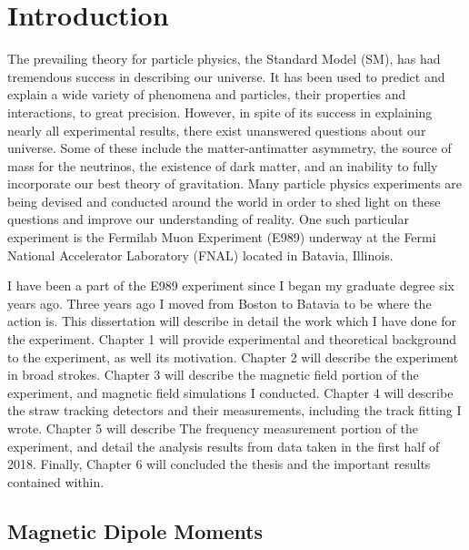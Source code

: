 
\thispagestyle{myheadings} %

\graphicspath{{Body/Figures/Theory/}}

\chapter{Introduction}
\label{chapter:Introduction}

The prevailing theory for particle physics, the Standard Model (SM), has had tremendous success in describing our universe. It has been used to predict and explain a wide variety of phenomena and particles, their properties and interactions, to great precision. However, in spite of its success in explaining nearly all experimental results, there exist unanswered questions about our universe. Some of these include the matter-antimatter asymmetry, the source of mass for the neutrinos, the existence of dark matter, and an inability to fully incorporate our best theory of gravitation. Many particle physics experiments are being devised and conducted around the world in order to shed light on these questions and improve our understanding of reality. One such particular experiment is the Fermilab Muon \gmtwo Experiment (E989) underway at the Fermi National Accelerator Laboratory (FNAL) located in Batavia, Illinois.

I have been a part of the E989 experiment since I began my graduate degree six years ago. Three years ago I moved from Boston to Batavia to be where the action is. This dissertation will describe in detail the work which I have done for the experiment. Chapter 1 will provide experimental and theoretical background to the experiment, as well its motivation. Chapter 2 will  describe the experiment in broad strokes. Chapter 3 will describe the magnetic field portion of the experiment, and magnetic field simulations I conducted. Chapter 4 will describe the straw tracking detectors and their measurements, including the track fitting I wrote. Chapter 5 will describe The frequency measurement portion of the experiment, and detail the analysis results from data taken in the first half of 2018. Finally, Chapter 6 will concluded the thesis and the important results contained within.


\section{Magnetic Dipole Moments}
\label{sec:MDMs}

